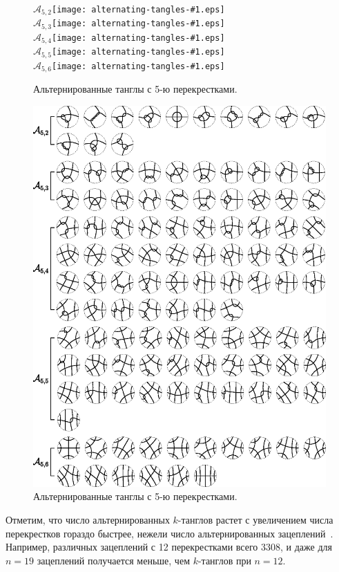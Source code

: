 \documentclass[12pt]{article}
\theoremstyle{plain}
\theoremstyle{definition}
\begin{document}
		\begin{figure}[ht]
			\centering
			\def\pic#1{\hbox{\protect\texttt{[image: alternating-tangles-\#1.eps]}}}
			$\mathcal A_{5,2}$\pic{52} \\
			$\mathcal A_{5,3}$\pic{53} \\
			$\mathcal A_{5,4}$\pic{54} \\
			$\mathcal A_{5,5}$\pic{55} \\
			$\mathcal A_{5,6}$\pic{56}
			\caption{\footnotesize Альтернированные танглы с 5-ю перекрестками.}
		\end{figure}

		\begin{figure}[ht]
			\centering
			\includegraphics[scale=0.8]{c/alternating-tangles-5.eps}
			\caption{\footnotesize Альтернированные танглы с 5-ю перекрестками.\label{figure:tangles5}}
		\end{figure}

		Отметим, что число альтернированных $k$-танглов растет с увеличением числа перекрестков гораздо быстрее, нежели число
		альтернированных зацеплений~\cite{RankinSchermannSmith2002_1, RankinSchermannSmith2002_2, RankinSmith2002}. Например, различных
		зацеплений с 12 перекрестками всего 3308, и даже для $n = 19$ зацеплений получается меньше, чем $k$-танглов при $n = 12$.
\end{document}
